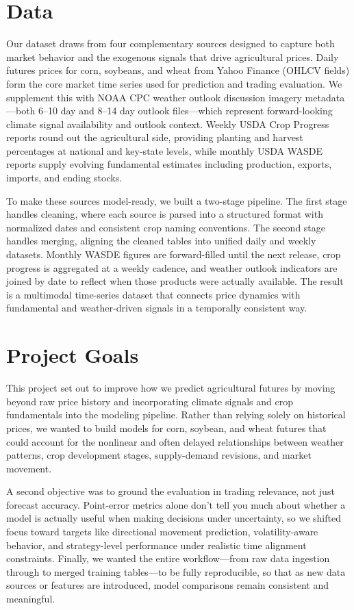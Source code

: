 \documentclass{article} %
\begin{document}
\section{Data}
Our dataset draws from four complementary sources designed to capture both market behavior and the exogenous signals that drive agricultural prices. Daily futures prices for corn, soybeans, and wheat from Yahoo Finance (OHLCV fields) form the core market time series used for prediction and trading evaluation. We supplement this with NOAA CPC weather outlook discussion imagery metadata—both 6–10 day and 8–14 day outlook files—which represent forward-looking climate signal availability and outlook context. Weekly USDA Crop Progress reports round out the agricultural side, providing planting and harvest percentages at national and key-state levels, while monthly USDA WASDE reports supply evolving fundamental estimates including production, exports, imports, and ending stocks.

To make these sources model-ready, we built a two-stage pipeline. The first stage handles cleaning, where each source is parsed into a structured format with normalized dates and consistent crop naming conventions. The second stage handles merging, aligning the cleaned tables into unified daily and weekly datasets. Monthly WASDE figures are forward-filled until the next release, crop progress is aggregated at a weekly cadence, and weather outlook indicators are joined by date to reflect when those products were actually available. The result is a multimodal time-series dataset that connects price dynamics with fundamental and weather-driven signals in a temporally consistent way.



\section{Project Goals}
This project set out to improve how we predict agricultural futures by moving beyond raw price history and incorporating climate signals and crop fundamentals into the modeling pipeline. Rather than relying solely on historical prices, we wanted to build models for corn, soybean, and wheat futures that could account for the nonlinear and often delayed relationships between weather patterns, crop development stages, supply-demand revisions, and market movement.

A second objective was to ground the evaluation in trading relevance, not just forecast accuracy. Point-error metrics alone don't tell you much about whether a model is actually useful when making decisions under uncertainty, so we shifted focus toward targets like directional movement prediction, volatility-aware behavior, and strategy-level performance under realistic time alignment constraints. Finally, we wanted the entire workflow—from raw data ingestion through to merged training tables—to be fully reproducible, so that as new data sources or features are introduced, model comparisons remain consistent and meaningful.
\end{document}
